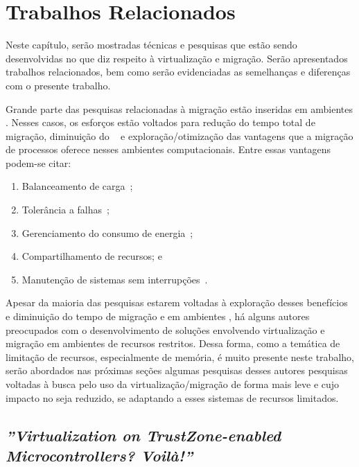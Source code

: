 \glsresetall
\chapter{Trabalhos Relacionados}
\label{chap.related-work}

Neste capítulo, serão mostradas técnicas e pesquisas que estão sendo desenvolvidas no que diz respeito à virtualização e migração. Serão apresentados trabalhos relacionados, bem como serão evidenciadas as semelhanças e diferenças com o presente trabalho.

Grande parte das pesquisas relacionadas à migração estão inseridas em ambientes \cloud. Nesses casos, os esforços estão voltados para redução do tempo total de migração, diminuição do \downtime~\cite{migration-linux-conteiners,clark2005live} e exploração/otimização das vantagens que a migração de processos oferece nesses ambientes computacionais. Entre essas vantagens podem-se citar:
\begin{enumerate}[label=(\roman*)]
    \item Balanceamento de carga~\cite{live-vm-migration-techniques,ada-things};
    \item Tolerância a falhas~\cite{fernando2019live};
    \item Gerenciamento do consumo de energia~\cite{aldossary2018performance};
    \item Compartilhamento de recursos; e
    \item Manutenção de sistemas sem interrupções~\cite{live-vm-migration-techniques,ada-things}.
\end{enumerate}

Apesar da maioria das pesquisas estarem voltadas à exploração desses benefícios e diminuição do tempo de migração e \downtime em ambientes \cloud, há alguns autores preocupados com o desenvolvimento de soluções envolvendo virtualização e migração em ambientes de recursos restritos. Dessa forma, como a temática de limitação de recursos, especialmente de memória, é muito presente neste trabalho, serão abordados nas próximas seções algumas pesquisas desses autores \ie pesquisas voltadas à busca pelo uso da virtualização/migração de forma mais leve e cujo impacto no \hardware seja reduzido, se adaptando a esses sistemas de recursos limitados.

\section{\textit{''Virtualization on TrustZone-enabled Microcontrollers? Voilà!''}}

